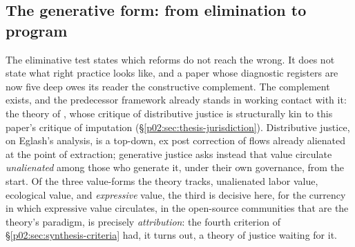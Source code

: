 \subsection{The generative form: from elimination to program}
\label{p02:sec:ex-generative}

The eliminative test states which reforms do not reach the wrong. It does not state what right practice looks like, and a paper whose diagnostic registers are now five deep owes its reader the constructive complement. The complement exists, and the predecessor framework already stands in working contact with it: the theory of  \parencite{eglash2016introduction}, whose critique of distributive justice is structurally kin to this paper's critique of imputation (\S\ref{p02:sec:thesis-jurisdiction}). Distributive justice, on Eglash's analysis, is a top-down, ex post correction of flows already alienated at the point of extraction; generative justice asks instead that value circulate \emph{unalienated} among those who generate it, under their own governance, from the start. Of the three value-forms the theory tracks, unalienated labor value, ecological value, and \emph{expressive} value, the third is decisive here, for the currency in which expressive value circulates, in the open-source communities that are the theory's paradigm, is precisely \emph{attribution}: the fourth criterion of \S\ref{p02:sec:synthesis-criteria} had, it turns out, a theory of justice waiting for it.

